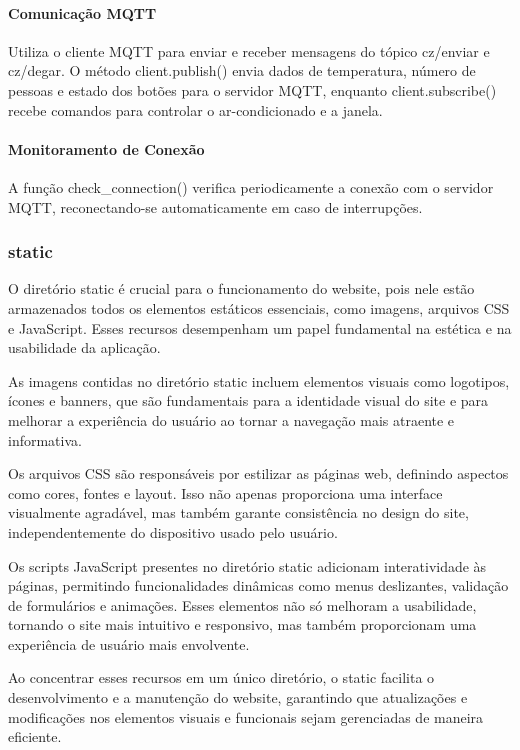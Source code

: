 \documentclass[conference, a4paper, 12pt]{IEEEtran}
\begin{document}
\paragraph{Comunicação MQTT}
Utiliza o cliente MQTT para enviar e receber mensagens do tópico cz/enviar e cz/degar. O método client.publish() envia dados de temperatura, número de pessoas e estado dos botões para o servidor MQTT, enquanto client.subscribe() recebe comandos para controlar o ar-condicionado e a janela.

\paragraph{Monitoramento de Conexão}
A função check\_connection() verifica periodicamente a conexão com o servidor MQTT, reconectando-se automaticamente em caso de interrupções.
\vspace{10pt}
\subsubsection{static}
O diretório static é crucial para o funcionamento do website, pois nele estão armazenados todos os elementos estáticos essenciais, como imagens, arquivos CSS e JavaScript. Esses recursos desempenham um papel fundamental na estética e na usabilidade da aplicação.

As imagens contidas no diretório static incluem elementos visuais como logotipos, ícones e banners, que são fundamentais para a identidade visual do site e para melhorar a experiência do usuário ao tornar a navegação mais atraente e informativa.

Os arquivos CSS são responsáveis por estilizar as páginas web, definindo aspectos como cores, fontes e layout. Isso não apenas proporciona uma interface visualmente agradável, mas também garante consistência no design do site, independentemente do dispositivo usado pelo usuário.

Os scripts JavaScript presentes no diretório static adicionam interatividade às páginas, permitindo funcionalidades dinâmicas como menus deslizantes, validação de formulários e animações. Esses elementos não só melhoram a usabilidade, tornando o site mais intuitivo e responsivo, mas também proporcionam uma experiência de usuário mais envolvente.

Ao concentrar esses recursos em um único diretório, o static facilita o desenvolvimento e a manutenção do website, garantindo que atualizações e modificações nos elementos visuais e funcionais sejam gerenciadas de maneira eficiente.
\end{document}
